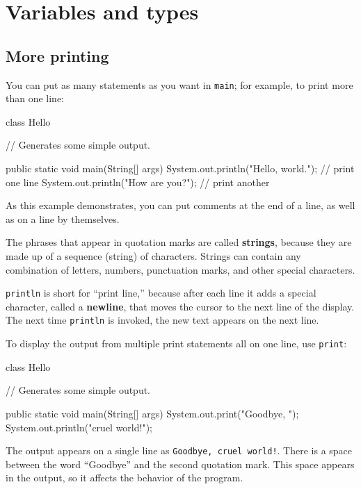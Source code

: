 \chapter{Variables and types}
\label{chap02}

\section{More printing}

You can put as many
statements as you want in {\tt main}; for example, to
print more than one line:

\begin{code}
class Hello {

  // Generates some simple output.

  public static void main(String[] args) {
    System.out.println("Hello, world.");     // print one line
    System.out.println("How are you?");      // print another
  }
}
\end{code}
%
As this example demonstrates, you can put comments at the
end of a line, as well as on a line by themselves.


The phrases that appear in quotation marks are called {\bf strings},
because they are made up of a sequence (string) of characters.
Strings can contain any combination of letters, numbers, punctuation
marks, and other special characters.


{\tt println} is short for ``print line,'' because after each
line it adds a special character, called a {\bf newline}, that
moves the cursor to the next line of the display.
The next time {\tt println} is invoked, the new text appears
on the next line.

To display the output from multiple print
statements all on one line, use {\tt print}:

\begin{code}
class Hello {

  // Generates some simple output.

  public static void main(String[] args) {
    System.out.print("Goodbye, ");
    System.out.println("cruel world!");
  }
}
\end{code}
%
The output appears on a single line as
{\tt Goodbye, cruel world!}.  There is a space
between the word ``Goodbye'' and the second quotation mark.
This space appears in the output, so it affects the behavior
of the program.

